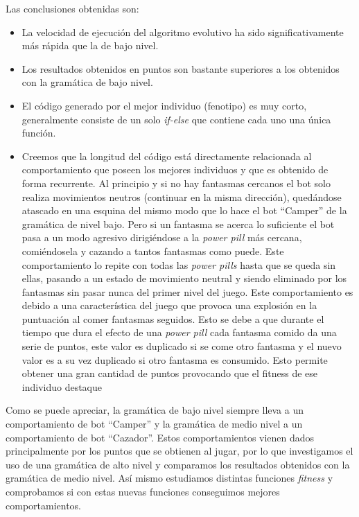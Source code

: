 Las conclusiones obtenidas son:
\begin{itemize}
\item La velocidad de ejecución del algoritmo evolutivo ha sido significativamente más rápida que la de bajo nivel.

\item Los resultados obtenidos en puntos son bastante superiores a los obtenidos con la gramática de bajo nivel.

\item El código generado por el mejor individuo (fenotipo) es muy corto, generalmente consiste de un solo \textit{if-else} que contiene cada uno una única función.

\item Creemos que la longitud del código está directamente relacionada al comportamiento que poseen los mejores individuos y que es obtenido de forma recurrente. Al principio y si no hay fantasmas cercanos el bot solo realiza movimientos neutros (continuar en la misma dirección), quedándose atascado en una esquina del mismo modo que lo hace el bot ``Camper'' de la gramática de nivel bajo. Pero si un fantasma se acerca lo suficiente el bot pasa a un modo agresivo dirigiéndose a la \textit{power pill} más cercana, comiéndosela y cazando a tantos fantasmas como puede. Este comportamiento lo repite con todas las \textit{power pills} hasta que se queda sin ellas, pasando a un estado de movimiento neutral y siendo eliminado por los fantasmas sin pasar nunca del primer nivel del juego. Este comportamiento es debido a una característica del juego que provoca una explosión en la puntuación al comer fantasmas seguidos. Esto se debe a que durante el tiempo que dura el efecto de una \textit{power pill} cada fantasma comido da una serie de puntos, este valor es duplicado si se come otro fantasma y el nuevo valor es a su vez duplicado si otro fantasma es consumido. Esto permite obtener una gran cantidad de puntos provocando que el fitness de ese individuo destaque
\end{itemize}

Como se puede apreciar, la gramática de bajo nivel siempre lleva a un comportamiento de bot ``Camper'' y la gramática de medio nivel a un comportamiento de bot ``Cazador''. Estos comportamientos vienen dados principalmente por los puntos que se obtienen al jugar, por lo que investigamos el uso de una gramática de alto nivel y comparamos los resultados obtenidos con la gramática de medio nivel. Así mismo estudiamos distintas funciones \textit{fitness} y comprobamos si con estas nuevas funciones conseguimos mejores comportamientos.

